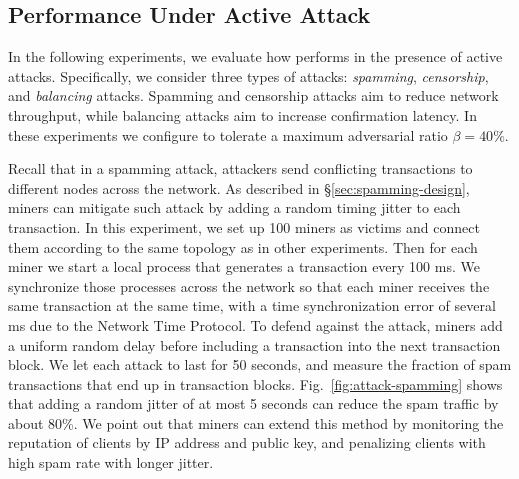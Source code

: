 \subsection{Performance Under Active Attack}
\label{sec:eval-attack}

In the following experiments, we evaluate how \prism performs in the presence of active attacks. Specifically, we consider three  types of attacks: {\em spamming}, \textit{censorship}, and \textit{balancing} attacks. Spamming and censorship attacks aim to reduce network throughput, while balancing attacks aim to increase confirmation latency. 
In these experiments we configure \prism to tolerate a maximum adversarial ratio $\beta=40\%$. 




\label{sec:spamming-eval}
 Recall that in a spamming attack, attackers send conflicting transactions to different nodes across the network. As described in \S\ref{sec:spamming-design}, miners can mitigate such attack by adding a random timing jitter to each transaction. In this experiment, we set up 100 miners as victims and connect them according to the same topology as in other experiments. Then for each miner we start a local process that generates a transaction every 100 ms. We synchronize those processes across the network so that each miner receives the same transaction at the same time, with a time synchronization error of several ms due to the Network Time Protocol. 
To defend against the attack, miners add a uniform random delay before including a transaction into the next transaction block. We let each attack to last for 50 seconds, and measure the fraction of spam transactions that end up in transaction blocks. 
Fig.~\ref{fig:attack-spamming} shows that adding a random jitter of at most 5 seconds can reduce the spam traffic by about 80\%. 
We point out that miners can extend this method by monitoring the reputation of clients by IP address and public key, and penalizing clients with high spam rate with longer jitter.

